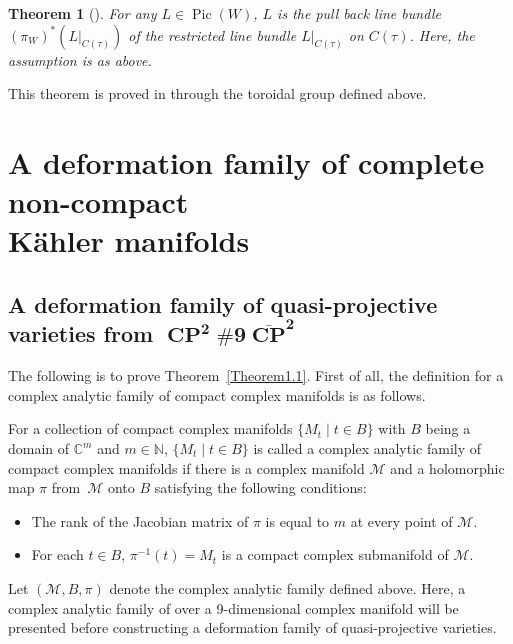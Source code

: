 \documentclass[pdftex]{sigma}
\numberwithin{equation}{section}
\newtheorem{Theorem}{Theorem}[section]
\begin{document}
\begin{Theorem}[{\cite[Proposition~3.3]{Takayuki-Takato2}}]\label{Theorem2.19}
 For any $L \in\operatorname{ Pic}(W)$, $L$ is the pull back line bundle~$(\pi_W)^*(L|_{C(\tau)})$ of the restricted line bundle $L|_{C(\tau)}$ on $C(\tau)$. Here, the assumption is as above.
\end{Theorem}

This theorem is proved in \cite{Takayuki-Takato2} through the toroidal group defined above.

\section[A deformation family of complete non-compact K\"ahler manifolds]{A deformation family of complete non-compact\\ K\"ahler manifolds}\label{sec3}

\subsection[A deformation family of quasi-projective varieties from CP\string^2 \#9CP\string^2]{A deformation family of quasi-projective varieties from $\boldsymbol{\operatorname{CP}^2 \#9 \overline{\operatorname{CP}}^2}$}\label{sec3.1}

The following is to prove Theorem~\ref{Theorem1.1}. First of all, the definition for a complex analytic family of compact complex manifolds is as follows.

\begin{Definition}\label{Definition3.1}
 For a collection of compact complex manifolds $ {\{M_t \mid t \!\in\! B\}}$ with $B$ being a domain of $\mathbb{C}^m$ and $m\in \mathbb{N} $, $ \{M_t \mid t \in B\}$ is called a complex analytic family of compact complex manifolds if there is a complex manifold $\mathcal{M}$ and a holomorphic map $\pi$ from~$\mathcal{M}$ onto $B$ satisfying the following conditions:
\begin{itemize}\itemsep=0pt
\item[$(1)$] The rank of the Jacobian matrix of $\pi$ is equal to $m$ at every point of $\mathcal{M}$.
\item[$(2)$] For each $t \in B$, $\pi^{-1}(t)=M_t$ is a compact complex submanifold of $\mathcal{M}$.
\end{itemize}
\end{Definition}

Let $(\mathcal{M},B,\pi)$ denote the complex analytic family defined above. Here, a complex analytic family of  over a 9-dimensional complex manifold will be presented before constructing a deformation family of quasi-projective varieties.
\end{document}
